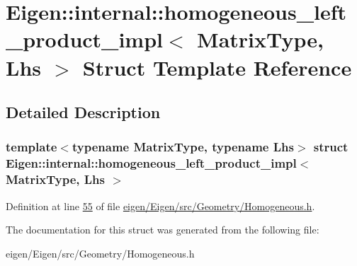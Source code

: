 \hypertarget{struct_eigen_1_1internal_1_1homogeneous__left__product__impl}{}\section{Eigen\+:\+:internal\+:\+:homogeneous\+\_\+left\+\_\+product\+\_\+impl$<$ Matrix\+Type, Lhs $>$ Struct Template Reference}
\label{struct_eigen_1_1internal_1_1homogeneous__left__product__impl}


\subsection{Detailed Description}
\subsubsection*{template$<$typename Matrix\+Type, typename Lhs$>$\newline
struct Eigen\+::internal\+::homogeneous\+\_\+left\+\_\+product\+\_\+impl$<$ Matrix\+Type, Lhs $>$}



Definition at line \hyperlink{eigen_2_eigen_2src_2_geometry_2_homogeneous_8h_source_l00055}{55} of file \hyperlink{eigen_2_eigen_2src_2_geometry_2_homogeneous_8h_source}{eigen/\+Eigen/src/\+Geometry/\+Homogeneous.\+h}.



The documentation for this struct was generated from the following file\+:\begin{DoxyCompactItemize}
\item 
eigen/\+Eigen/src/\+Geometry/\+Homogeneous.\+h\end{DoxyCompactItemize}
